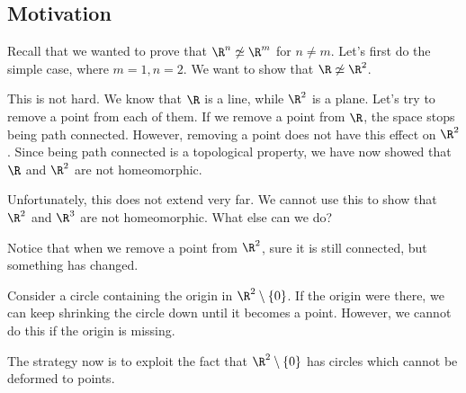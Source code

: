 \documentclass[a4paper]{article}
\begin{document}
\setcounter{subsection}{-1}
\subsection{Motivation}
Recall that we wanted to prove that $\R^n \not\simeq \R^m$ for $n\not= m$. Let's first do the simple case, where $m = 1, n = 2$. We want to show that $\R\not\simeq \R^2$.

This is not hard. We know that $\R$ is a line, while $\R^2$ is a plane. Let's try to remove a point from each of them.  If we remove a point from $\R$, the space stops being path connected. However, removing a point does not have this effect on $\R^2$. Since being path connected is a topological property, we have now showed that $\R$ and $\R^2$ are not homeomorphic.

Unfortunately, this does not extend very far. We cannot use this to show that $\R^2$ and $\R^3$ are not homeomorphic. What else can we do?

Notice that when we remove a point from $\R^2$, sure it is still connected, but something has changed.

Consider a circle containing the origin in $\R^2 \setminus \{0\}$. If the origin were there, we can keep shrinking the circle down until it becomes a point. However, we cannot do this if the origin is missing.
\begin{center}
\end{center}
The strategy now is to exploit the fact that $\R^2 \setminus \{0\}$ has circles which cannot be deformed to points.
\end{document}
